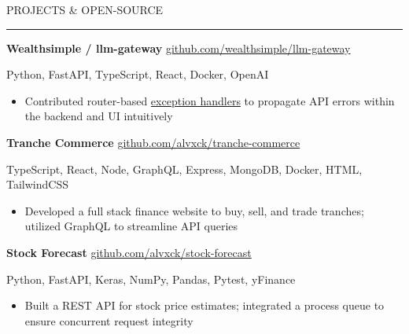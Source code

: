 \documentclass[9pt]{extarticle}
\begin{document}
\vspace{5pt}

\begin{adjustwidth}{4pt}{4pt} \large {\selectfont PROJECTS \& OPEN-SOURCE} \end{adjustwidth}
\rule[8pt]{\linewidth}{0.4pt}

\begin{adjustwidth}{10pt}{10pt}
	\vspace{-5pt}

	\textcolor{imptextblack}{\textbf{\large Wealthsimple / llm-gateway}} \hfill \href{https://github.com/wealthsimple/llm-gateway}{github.com/wealthsimple/llm-gateway}
	
	Python, FastAPI, TypeScript, React, Docker, OpenAI
	
	\begin{itemize}[topsep=0pt, labelsep=10pt, leftmargin=24pt, label=\textcolor{imptextblack}{\textbullet}]
		\item Contributed router-based \href{https://github.com/wealthsimple/llm-gateway/pull/27}{exception handlers} to propagate API errors within the backend and UI intuitively
	\end{itemize}
	
	\vspace{5pt}
	\textcolor{imptextblack}{\textbf{\large Tranche Commerce}} \hfill \href{https://github.com/alvxck/tranche-commerce}{github.com/alvxck/tranche-commerce}
	
	TypeScript, React, Node, GraphQL, Express, MongoDB, Docker, HTML, TailwindCSS
	
	\begin{itemize}[topsep=0pt, labelsep=10pt, leftmargin=24pt, label=\textcolor{imptextblack}{\textbullet}]
		\item Developed a full stack finance website to buy, sell, and trade tranches; utilized \textcolor{imptextblack}{GraphQL} to streamline API queries
	\end{itemize}
	
	\vspace{5pt}
	\textcolor{imptextblack}{\textbf{\large Stock Forecast}} \hfill \href{https://github.com/alvxck/stock-forecast}{github.com/alvxck/stock-forecast}
	
	Python, FastAPI, Keras, NumPy, Pandas, Pytest, yFinance
	
	\begin{itemize}[topsep=0pt, labelsep=10pt, leftmargin=24pt, label=\textcolor{imptextblack}{\textbullet}]
		\item Built a REST API for stock price estimates; integrated a process \textcolor{imptextblack}{queue} to ensure concurrent request integrity
	\end{itemize}
\end{adjustwidth}
\end{document}
